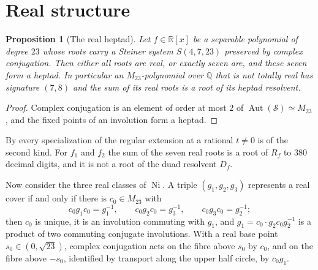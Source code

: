 \documentclass[11pt]{amsart}
\newtheorem{proposition}[theorem]{Proposition}
\theoremstyle{definition}
\newcommand{\QQ}{\mathbb{Q}}
\newcommand{\RR}{\mathbb{R}}
\newcommand{\Aut}{\operatorname{Aut}}
\newcommand{\Ni}{\operatorname{Ni}}
\newcommand{\M}{M_{23}}
\newcommand{\cS}{\mathcal{S}}
\begin{document}
\section{Real structure}\label{sec:real}

\begin{proposition}[The real heptad]\label{prop:realheptad}
Let $f\in\RR[x]$ be a separable polynomial of degree $23$ whose roots carry a Steiner system $S(4,7,23)$ preserved by complex conjugation. Then either all roots are real, or exactly seven are, and these seven form a heptad. In particular an $\M$-polynomial over $\QQ$ that is not totally real has signature $(7,8)$ and the sum of its real roots is a root of its heptad resolvent.
\end{proposition}
\begin{proof}
Complex conjugation is an element of order at most $2$ of $\Aut(\cS)\simeq\M$, and the fixed points of an involution form a heptad.
\end{proof}

By \cite[Prop.~3.18(b)]{HJLPPZ26} every specialization of the regular extension at a rational $t\ne0$ is of the second kind. For $f_1$ and $f_2$ the sum of the seven real roots is a root of $R_f$ to $380$ decimal digits, and it is not a root of the duad resolvent $D_f$.

Now consider the three real classes of $\Ni$. A triple $(g_1,g_2,g_3)$ represents a real cover if and only if there is $c_0\in\M$ with
\[
c_0g_1c_0=g_1^{-1},\qquad c_0g_2c_0=g_3^{-1},\qquad c_0g_3c_0=g_2^{-1};
\]
then $c_0$ is unique, it is an involution commuting with $g_1$, and $g_1=c_0\cdot g_2c_0g_2^{-1}$ is a product of two commuting conjugate involutions. With a real base point $s_0\in(0,\sqrt{23})$, complex conjugation acts on the fibre above $s_0$ by $c_0$, and on the fibre above $-s_0$, identified by transport along the upper half circle, by $c_0g_1$.
\end{document}
